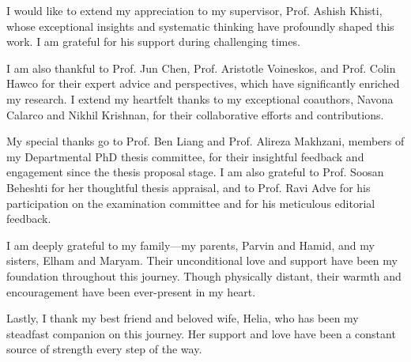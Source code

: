 \begin{spacing}{1.5}

I would like to extend my appreciation to my supervisor, Prof. Ashish Khisti, whose exceptional insights and systematic thinking have profoundly shaped this work. I am grateful for his support during challenging times.

I am also thankful to Prof. Jun Chen, Prof. Aristotle Voineskos, and Prof. Colin Hawco for their expert advice and perspectives, which have significantly enriched my research. I extend my heartfelt thanks to my exceptional coauthors, Navona Calarco and Nikhil Krishnan, for their collaborative efforts and contributions.

My special thanks go to Prof. Ben Liang and Prof. Alireza Makhzani, members of my Departmental PhD thesis committee, for their insightful feedback and engagement since the thesis proposal stage. I am also grateful to Prof. Soosan Beheshti for her thoughtful thesis appraisal, and to Prof. Ravi Adve for his participation on the examination committee and for his meticulous editorial feedback.

I am deeply grateful to my family—my parents, Parvin and Hamid, and my sisters, Elham and Maryam. Their unconditional love and support have been my foundation throughout this journey. Though physically distant, their warmth and encouragement have been ever-present in my heart.

Lastly, I thank my best friend and beloved wife, Helia, who has been my steadfast companion on this journey. Her support and love have been a constant source of strength every step of the way.

\end{spacing}
